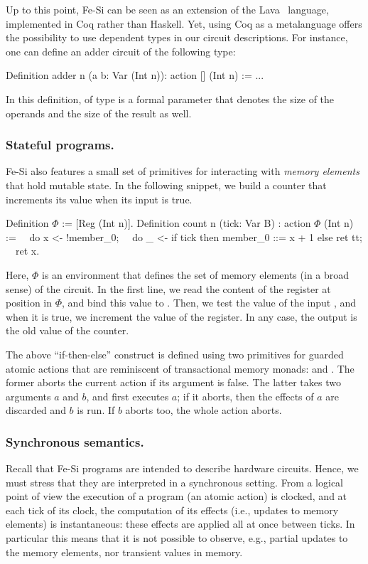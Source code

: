 \documentclass{llncs}
\begin{document}

Up to this point, Fe-Si can be seen as an extension of the
Lava~\cite{Bjesse98lava:hardware} language, implemented in Coq rather
than Haskell. Yet, using Coq as a metalanguage offers the possibility
to use dependent types in our circuit descriptions. For instance, one
can define an adder circuit of the following type:
\begin{mcoq}
Definition adder n (a b: Var (Int n)): action [] (Int n) := ...
\end{mcoq}
In this definition,  of type  is a formal parameter
that denotes the size of the operands and the size of the result as
well. 

\subsubsection{Stateful programs.}
Fe-Si also features a small set of primitives for interacting with
\emph{memory elements} that hold mutable state. In the following
snippet, we build a counter that increments its value when its input
is true.
\begin{mcoq}
Definition $\Phi$ := [Reg (Int n)].
Definition count n (tick: Var B) : action $\Phi$ (Int n) :=
$\quad$do x <- !member_0;
$\quad$do _ <- if tick then {member_0 ::= x + 1} else {ret tt}; 
$\quad$ret x. 
\end{mcoq}
Here, $\Phi$ is an environment that defines the set of memory elements
(in a broad sense) of the circuit. In the first line, we read the
content of the register at position  in $\Phi$, and
bind this value to . Then, we test the value of the input
, and when it is true, we increment the value of the
register. In any case, the output is the old value of the counter.

The above ``if-then-else'' construct is defined using two primitives
for guarded atomic actions that are reminiscent of transactional
memory monads:  and . The former aborts the
current action if its argument is false.
%
The latter takes two arguments $a$ and $b$, and first executes $a$; if
it aborts, then the effects of $a$ are discarded and $b$ is run. If
$b$ aborts too, the whole action  aborts.

\subsubsection{Synchronous semantics.} Recall that Fe-Si programs are
intended to describe hardware circuits. Hence, we must stress that
they are interpreted in a synchronous setting.
%
From a logical point of view the execution of a program (an atomic
action) is clocked, and at each tick of its clock, the computation of
its effects (i.e., updates to memory elements) is instantaneous: these
effects are applied all at once between ticks.
%
In particular this means that it is not possible to observe, e.g.,
partial updates to the memory elements, nor transient values in
memory.
\end{document}
